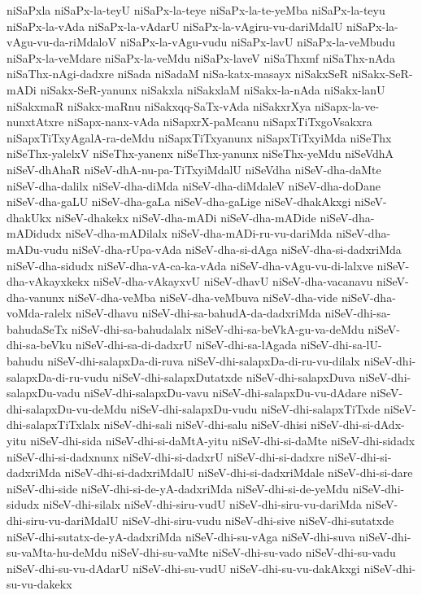 {niSaPxla
niSaPx-la-teyU
niSaPx-la-teye
niSaPx-la-te-yeMba
niSaPx-la-teyu
niSaPx-la-vAda
niSaPx-la-vAdarU
niSaPx-la-vAgiru-vu-dariMdalU
niSaPx-la-vAgu-vu-da-riMdaloV
niSaPx-la-vAgu-vudu
niSaPx-lavU
niSaPx-la-veMbudu
niSaPx-la-veMdare
niSaPx-la-veMdu
niSaPx-laveV
niSaThxmf
niSaThx-nAda
niSaThx-nAgi-dadxre
niSada
niSadaM
niSa-katx-masayx
niSakxSeR
niSakx-SeR-mADi
niSakx-SeR-yanunx
niSakxla
niSakxlaM
niSakx-la-nAda
niSakx-lanU
niSakxmaR
niSakx-maRnu
niSakxqq-SaTx-vAda
niSakxrXya
niSapx-la-ve-nunxtAtxre
niSapx-nanx-vAda
niSapxrX-paMcanu
niSapxTiTxgoVsakxra
niSapxTiTxyAgalA-ra-deMdu
niSapxTiTxyanunx
niSapxTiTxyiMda
niSeThx
niSeThx-yalelxV
niSeThx-yanenx
niSeThx-yanunx
niSeThx-yeMdu
niSeVdhA
niSeV-dhAhaR
niSeV-dhA-nu-pa-TiTxyiMdalU
niSeVdha
niSeV-dha-daMte
niSeV-dha-dalilx
niSeV-dha-diMda
niSeV-dha-diMdaleV
niSeV-dha-doDane
niSeV-dha-gaLU
niSeV-dha-gaLa
niSeV-dha-gaLige
niSeV-dhakAkxgi
niSeV-dhakUkx
niSeV-dhakekx
niSeV-dha-mADi
niSeV-dha-mADide
niSeV-dha-mADidudx
niSeV-dha-mADilalx
niSeV-dha-mADi-ru-vu-dariMda
niSeV-dha-mADu-vudu
niSeV-dha-rUpa-vAda
niSeV-dha-si-dAga
niSeV-dha-si-dadxriMda
niSeV-dha-sidudx
niSeV-dha-vA-ca-ka-vAda
niSeV-dha-vAgu-vu-di-lalxve
niSeV-dha-vAkayxkekx
niSeV-dha-vAkayxvU
niSeV-dhavU
niSeV-dha-vacanavu
niSeV-dha-vanunx
niSeV-dha-veMba
niSeV-dha-veMbuva
niSeV-dha-vide
niSeV-dha-voMda-ralelx
niSeV-dhavu
niSeV-dhi-sa-bahudA-da-dadxriMda
niSeV-dhi-sa-bahudaSeTx
niSeV-dhi-sa-bahudalalx
niSeV-dhi-sa-beVkA-gu-va-deMdu
niSeV-dhi-sa-beVku
niSeV-dhi-sa-di-dadxrU
niSeV-dhi-sa-lAgada
niSeV-dhi-sa-lU-bahudu
niSeV-dhi-salapxDa-di-ruva
niSeV-dhi-salapxDa-di-ru-vu-dilalx
niSeV-dhi-salapxDa-di-ru-vudu
niSeV-dhi-salapxDutatxde
niSeV-dhi-salapxDuva
niSeV-dhi-salapxDu-vadu
niSeV-dhi-salapxDu-vavu
niSeV-dhi-salapxDu-vu-dAdare
niSeV-dhi-salapxDu-vu-deMdu
niSeV-dhi-salapxDu-vudu
niSeV-dhi-salapxTiTxde
niSeV-dhi-salapxTiTxlalx
niSeV-dhi-sali
niSeV-dhi-salu
niSeV-dhisi
niSeV-dhi-si-dAdx-yitu
niSeV-dhi-sida
niSeV-dhi-si-daMtA-yitu
niSeV-dhi-si-daMte
niSeV-dhi-sidadx
niSeV-dhi-si-dadxnunx
niSeV-dhi-si-dadxrU
niSeV-dhi-si-dadxre
niSeV-dhi-si-dadxriMda
niSeV-dhi-si-dadxriMdalU
niSeV-dhi-si-dadxriMdale
niSeV-dhi-si-dare
niSeV-dhi-side
niSeV-dhi-si-de-yA-dadxriMda
niSeV-dhi-si-de-yeMdu
niSeV-dhi-sidudx
niSeV-dhi-silalx
niSeV-dhi-siru-vudU
niSeV-dhi-siru-vu-dariMda
niSeV-dhi-siru-vu-dariMdalU
niSeV-dhi-siru-vudu
niSeV-dhi-sive
niSeV-dhi-sutatxde
niSeV-dhi-sutatx-de-yA-dadxriMda
niSeV-dhi-su-vAga
niSeV-dhi-suva
niSeV-dhi-su-vaMta-hu-deMdu
niSeV-dhi-su-vaMte
niSeV-dhi-su-vado
niSeV-dhi-su-vadu
niSeV-dhi-su-vu-dAdarU
niSeV-dhi-su-vudU
niSeV-dhi-su-vu-dakAkxgi
niSeV-dhi-su-vu-dakekx
}
